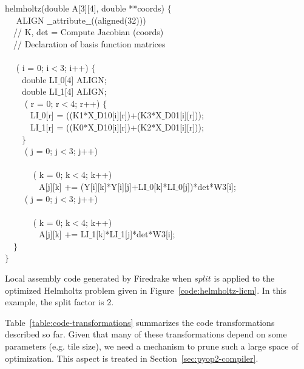 \documentclass[conference]{IEEEtran}
\begin{document}
\begin{algorithm}[t]
\small
{} helmholtz(double A[3][4], double **coords) $\lbrace$\\
~~ ALIGN $\_\_$attribute$\_\_$((aligned(32))) \\
~~// K, det = Compute Jacobian (coords) \\
~~// Declaration of basis function matrices \\
~~\\
~~ ( i = 0; i$<$3; i++) $\lbrace$ \\
~~~~double LI$\_$0[4] ALIGN;\\
~~~~double LI$\_$1[4] ALIGN;\\
~~~~ ( r = 0; r$<$4; r++) $\lbrace$ \\
~~~~~~LI$\_$0[r] = ((K1*X$\_$D10[i][r])+(K3*X$\_$D01[i][r]));\\
~~~~~~LI$\_$1[r] = ((K0*X$\_$D10[i][r])+(K2*X$\_$D01[i][r]));\\
~~~~$\rbrace$\\
~~~~ ( j = 0; j$<$3; j++) \\
~~~~~~\\
~~~~~~ ( k = 0; k$<$4; k++) \\
~~~~~~~~A[j][k] += (Y[i][k]*Y[i][j]+LI$\_$0[k]*LI$\_$0[j])*det*W3[i];\\
~~~~ ( j = 0; j$<$3; j++) \\
~~~~~~\\
~~~~~~ ( k = 0; k$<$4; k++) \\
~~~~~~~~A[j][k] += LI$\_$1[k]*LI$\_$1[j]*det*W3[i];\\
~~$\rbrace$\\
$\rbrace$
\caption{Local assembly code generated by Firedrake when $split$ is applied to the optimized Helmholtz problem given in Figure~\ref{code:helmholtz-licm}. In this example, the split factor is 2.}
\label{code:helmholtz-split}
\end{algorithm}

Table~\ref{table:code-transformations} summarizes the code transformations described so far. Given that many of these transformations depend on some parameters (e.g. tile size), we need a mechanism to prune such a large space of optimization. This aspect is treated in Section~\ref{sec:pyop2-compiler}.
\end{document}
